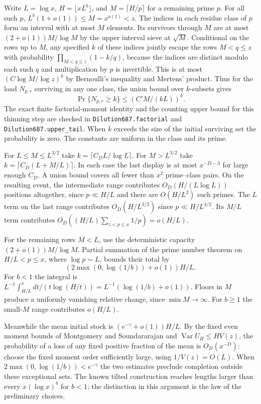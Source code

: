 \documentclass[11pt]{article}
\begin{document}
Write $L=\log x$, $H=\lfloor x L^b\rfloor$, and
$M=\lceil H/p\rceil$ for a remaining prime $p$. For all such $p$,
$L^b(1+o(1))\le M=x^{o(1)}<z$. The indices in each residue class
of $p$ form an interval with at most $M$ elements. Its survivors
through $M$ are at most $(2+o(1))M/\log M$ by the upper interval
sieve at $\sqrt M$. Conditional on the rows up to $M$, any specified
$k$ of these indices jointly escape the rows $M<q\le z$ with
probability $\prod_{M<q\le z}(1-k/q)$, because the indices are
distinct modulo each such $q$ and multiplication by $p$ is invertible.
This is at most $(C\log M/\log z)^k$ by Bernoulli's inequality and
Mertens' product. Thus for the load $N_{p,r}$ surviving in any one
class, the union bound over $k$-subsets gives
\[
                    \Pr\{N_{p,r}\ge k\}\le (C'M/(kL))^k .
\]
The exact finite factorial-moment identity and the counting upper
bound for this thinning step are checked in
\texttt{Dilution687.factorial} and \texttt{Dilution687.upper\_tail}.
When $k$ exceeds the size of the initial surviving set the probability
is zero. The constants are uniform in the class and its prime.

For $L\le M\le L^{3/2}$ take $k=\lceil C_D L/\log L\rceil$.
For $M>L^{3/2}$ take $k=\lceil C_D(L+M/L)\rceil$. In each case the
last display is at most $x^{-D-3}$ for large enough $C_D$. A union
bound covers all fewer than $x^2$ prime--class pairs. On the resulting
event, the intermediate range contributes $O_D(H/(L\log L))$ positions
altogether, since $p\ll H/L$ and there are $O(H/L^2)$ such primes.
The $L$ term on the last range contributes $O_D(H/L^{3/2})$ since
$p\ll H/L^{3/2}$. Its $M/L$ term contributes
$O_D((H/L)\sum_{z<p\le x}1/p)=o(H/L)$.

For the remaining rows $M<L$, use the deterministic capacity
$(2+o(1))M/\log M$. Partial summation of the prime number theorem on
$H/L<p\le x$, where $\log p\sim L$, bounds their total by
\[
  \left(2\max(0,\log(1/b))+o(1)\right)H/L .
\]
For $b<1$ the integral is
$L^{-1}\int_{H/L}^x dt/(t\log(H/t))
 =L^{-1}(\log(1/b)+o(1))$. Floors in $M$ produce a uniformly
vanishing relative change, since $\min M\to\infty$. For $b\ge1$
the small-$M$ range contributes $o(H/L)$.

Meanwhile the mean initial stock is $(e^{-\gamma}+o(1))H/L$.
By the fixed even moment bounds of Montgomery and Soundararajan
and $\operatorname{Var}U_H\le HV(z)$, the probability of a loss
of any fixed positive fraction of the mean is $O_D(x^{-D})$:
choose the fixed moment order sufficiently large, using
$1/V(z)=O(L)$. When $2\max(0,\log(1/b))<e^{-\gamma}$ the two
estimates preclude completion outside these exceptional sets.
The known tilted construction reaches lengths larger than every
$x(\log x)^b$ for $b<1$; the distinction in this argument is the
law of the preliminary choices.
\end{document}
